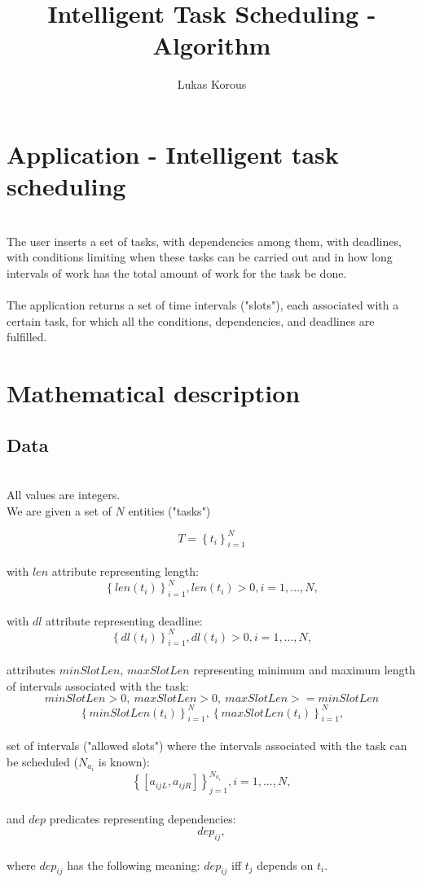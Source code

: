 \documentclass[smallextended]{svjour3}       %
\begin{document}
\title{Intelligent Task Scheduling - Algorithm}


\author{Lukas Korous}


\maketitle

\section{Application - Intelligent task scheduling}\ \\
The user inserts a set of tasks, with dependencies among them, with deadlines, with conditions limiting when these tasks can be carried out and in how long intervals of work has the total amount of work for the task be done.\ \\\ \\

The application returns a set of time intervals ("slots"), each associated with a certain task, for which all the conditions, dependencies, and deadlines are fulfilled.

\section{Mathematical description}
\subsection{Data}\ \\ 
All values are integers.\ \\
We are given a set of $N$ entities ("tasks")

$$T = \left\{t_i\right\}_{i = 1}^{N}$$
\ \\
with $len$ attribute representing length:
$$\left\{len\left(t_i\right)\right\}_{i = 1}^{N}, len\left(t_i\right) > 0, i = 1, ..., N,$$
\ \\
with $dl$ attribute representing deadline:
$$\left\{dl\left(t_i\right)\right\}_{i = 1}^{N}, dl\left(t_i\right) > 0, i = 1, ..., N,$$
\ \\
attributes $minSlotLen,\,maxSlotLen$ representing minimum and maximum length of intervals associated with the task:
$$minSlotLen > 0,\ maxSlotLen > 0,\ maxSlotLen >= minSlotLen$$
$$\left\{minSlotLen\left(t_i\right)\right\}_{i = 1}^{N}, \left\{maxSlotLen\left(t_i\right)\right\}_{i = 1}^{N},$$
\ \\
set of intervals ("allowed slots") where the intervals associated with the task can be scheduled ($N_{a_i}$ is known):
$$\left\{\left[a_{ijL}, a_{ijR}\right]\right\}_{j = 1}^{N_{a_i}}, i = 1, ..., N,$$
\ \\
and $dep$ predicates representing dependencies:
$$dep_{ij},$$
\ \\
where $dep_{ij}$ has the following meaning: $dep_{ij}$ iff $t_j$ depends on $t_i$.
\end{document}
